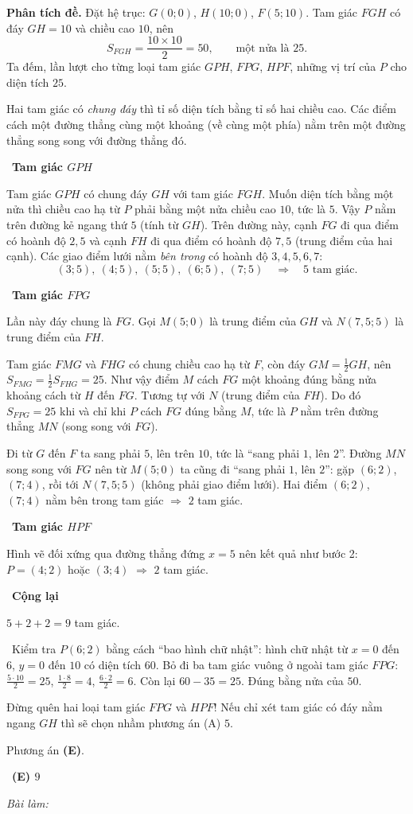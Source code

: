 \documentclass[11pt]{article}
\newif\ifsol \solfalse
\providecommand{\AnsWord}{Đáp số}
\newcommand{\StuProb}[2]{\begin{probboxS}{#1}{#2}\StuProbBody\end{probboxS}}
\newcommand{\ans}[1]{\par\smallskip{\bfseries\color{tmGreen!88!black}\AnsWord:}\ {\bfseries\color{AnsRed}#1}\par}
\newcommand{\probsol}[1]{%
  \begin{lrbox}{\solmeasure}\begin{minipage}{\dimexpr\linewidth-24pt\relax}#1\end{minipage}\end{lrbox}%
  \ifsol
    \begin{solbox}#1\end{solbox}%
  \else
    \setlength{\solht}{\dimexpr\ht\solmeasure+\dp\solmeasure+0.85cm\relax}%
    \ifdim\solht<1.35cm\setlength{\solht}{1.35cm}\fi
    \ifdim\solht>\StudentMaxWork\setlength{\solht}{\StudentMaxWork}\fi
    \par\noindent\begin{minipage}{\linewidth}%
    \expandafter\StuProb\StuProbArgs
    \begin{tcolorbox}[colback=white,colframe=Line,boxrule=0.8pt,arc=5pt,
      left=8pt,right=8pt,top=4pt,bottom=4pt,height=\solht]{\footnotesize\color{Slate}\itshape\WorkWord}\end{tcolorbox}%
    \end{minipage}\par\medskip
  \fi}
\newlength{\StudentMaxWork}\setlength{\StudentMaxWork}{4.5cm}
\newcommand{\step}[2]{\par\smallskip\noindent{\bfseries\color{tmBlue!85!black}\StepWord~#1.}\ {\bfseries #2}\par\nopagebreak}
\newcommand{\verify}[1]{\par\smallskip\noindent{\bfseries\color{tmGreen!80!black}\faCheckCircle\ \CheckWord}\ #1\par}
\def\WorkWord{Bài làm:}
\def\AnsWord{Đáp số}
\def\StepWord{Bước}
\def\CheckWord{Thử lại:}
\begin{document}
\probsol{
\textbf{Phân tích đề.} Đặt hệ trục: $G(0;0)$, $H(10;0)$, $F(5;10)$. Tam giác $FGH$ có đáy $GH=10$ và chiều
cao $10$, nên
\[ S_{FGH}=\frac{10\times 10}{2}=50,\qquad \text{một nửa là } 25. \]
Ta đếm, lần lượt cho từng loại tam giác $GPH$, $FPG$, $HPF$, những vị trí của $P$ cho diện tích $25$.

\begin{recallbox}Hai tam giác có \emph{chung đáy} thì tỉ số diện tích bằng tỉ số hai chiều cao.
Các điểm cách một đường thẳng cùng một khoảng (về cùng một phía) nằm trên một đường thẳng song song
với đường thẳng đó.\end{recallbox}

\step{1}{Tam giác $GPH$}
Tam giác $GPH$ có chung đáy $GH$ với tam giác $FGH$. Muốn diện tích bằng một nửa thì chiều cao hạ từ $P$
phải bằng một nửa chiều cao $10$, tức là $5$. Vậy $P$ nằm trên đường kẻ ngang thứ $5$ (tính từ $GH$).
Trên đường này, cạnh $FG$ đi qua điểm có hoành độ $2{,}5$ và cạnh $FH$ đi qua điểm có hoành độ $7{,}5$
(trung điểm của hai cạnh). Các giao điểm lưới nằm \emph{bên trong} có hoành độ $3,4,5,6,7$:
\[ (3;5),\ (4;5),\ (5;5),\ (6;5),\ (7;5)\quad\Rightarrow\quad 5 \text{ tam giác.} \]

\step{2}{Tam giác $FPG$}
Lần này đáy chung là $FG$. Gọi $M(5;0)$ là trung điểm của $GH$ và $N(7{,}5;5)$ là trung điểm của $FH$.
\begin{proofbox}Tam giác $FMG$ và $FHG$ có chung chiều cao hạ từ $F$, còn đáy $GM=\tfrac12 GH$, nên
$S_{FMG}=\tfrac12 S_{FHG}=25$. Như vậy điểm $M$ cách $FG$ một khoảng đúng bằng nửa khoảng cách từ $H$
đến $FG$. Tương tự với $N$ (trung điểm của $FH$). Do đó $S_{FPG}=25$ khi và chỉ khi $P$ cách $FG$ đúng bằng
$M$, tức là $P$ nằm trên đường thẳng $MN$ (song song với $FG$).\end{proofbox}
Đi từ $G$ đến $F$ ta sang phải $5$, lên trên $10$, tức là ``sang phải $1$, lên $2$''. Đường $MN$ song song với
$FG$ nên từ $M(5;0)$ ta cũng đi ``sang phải $1$, lên $2$'': gặp $(6;2)$, $(7;4)$, rồi tới $N(7{,}5;5)$ (không
phải giao điểm lưới). Hai điểm $(6;2)$, $(7;4)$ nằm bên trong tam giác $\Rightarrow$ $2$ tam giác.

\step{3}{Tam giác $HPF$}
Hình vẽ đối xứng qua đường thẳng đứng $x=5$ nên kết quả như bước 2: $P=(4;2)$ hoặc $(3;4)$
$\Rightarrow$ $2$ tam giác.

\step{4}{Cộng lại}
$5+2+2=9$ tam giác.

\verify{Kiểm tra $P(6;2)$ bằng cách ``bao hình chữ nhật'': hình chữ nhật từ $x=0$ đến $6$, $y=0$ đến $10$ có
diện tích $60$. Bỏ đi ba tam giác vuông ở ngoài tam giác $FPG$: $\tfrac{5\cdot 10}{2}=25$, $\tfrac{1\cdot 8}{2}=4$,
$\tfrac{6\cdot 2}{2}=6$. Còn lại $60-35=25$. Đúng bằng nửa của $50$.}
\begin{warnbox}Đừng quên hai loại tam giác $FPG$ và $HPF$! Nếu chỉ xét tam giác có đáy nằm ngang $GH$
thì sẽ chọn nhầm phương án (A) $5$.\end{warnbox}
Phương án \textbf{(E)}.
\ans{(E) $9$}
}
\end{document}
